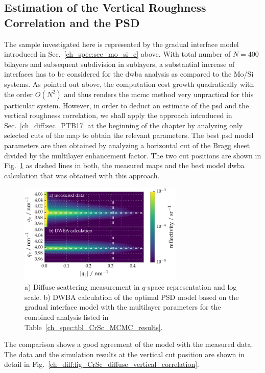 \subsection{Estimation of the Vertical Roughness Correlation and the PSD}
The sample investigated here is represented by the gradual interface model introduced in Sec.~\ref{ch_spec:sec_mo_si_c} above. With total number of $N=400$ bilayers and subsequent subdivision in sublayers, a substantial increase of interfaces has to be considered for the \gls{dwba} analysis as compared to the Mo/Si systems. As pointed out above, the computation cost growth quadratically with the order $O(N^2)$ and thus renders the \gls{mcmc} method very unpractical for this particular system. However, in order to deduct an estimate of the \gls{psd} and the vertical roughness correlation, we shall apply the approach introduced in Sec.~\ref{ch_diff:sec_PTB17} at the beginning of the chapter by analyzing only selected cuts of the map to obtain the relevant parameters. The best \gls{psd} model parameters are then obtained by analyzing a horizontal cut of the Bragg sheet divided by the multilayer enhancement factor. The two cut positions are shown in Fig.~\ref{ch_diff:fig_CrSc_diffuse_measured_vs_dwba} as dashed lines in both, the measured maps and the best model \gls{dwba} calculation that was obtained with this approach.
\begin{figure}[htbp]
  \centering
  \includegraphics[width=0.7\textwidth]{img/CrSc_diffuse_measured_vs_dwba}
  \caption{a) Diffuse scattering measurement in $q$-space representation and 
log scale. b) DWBA calculation of the optimal PSD model based on the gradual interface model with the multilayer parameters for the combined analysis listed 
in Table~\ref{ch_spec:tbl_CrSc_MCMC_results}.}
  \label{ch_diff:fig_CrSc_diffuse_measured_vs_dwba}
\end{figure}
The comparison shows a good agreement of the model with the measured data. The data and the simulation results at the vertical cut position are shown in detail in Fig.~\ref{ch_diff:fig_CrSc_diffuse_vertical_correlation}.
